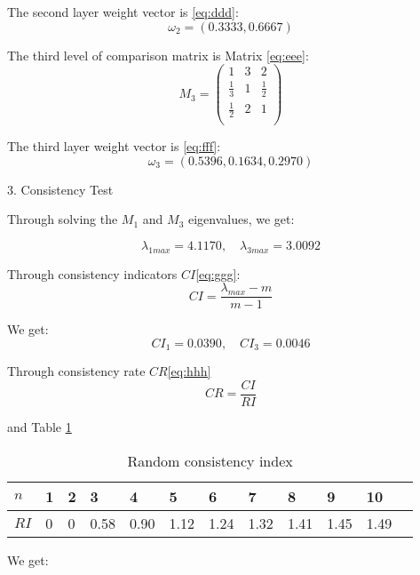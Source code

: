 \documentclass[12pt]{article}  %
\begin{document}
The second layer weight vector is \eqref{eq:ddd}:
\begin{equation}\label{eq:ddd}%
\omega_2=(0.3333,0.6667)
\end{equation}

The third level of comparison matrix is Matrix \eqref{eq:eee}:
\begin{equation}\label{eq:eee}%
M_3=\begin{pmatrix}
1&3&2\\
\frac{1}{3}&1&\frac{1}{2}\\
\frac{1}{2}&2&1\\
\end{pmatrix}
\end{equation}

The third layer weight vector is \eqref{eq:fff}:
\begin{equation}\label{eq:fff}%
\omega_3=(0.5396,0.1634,0.2970)
\end{equation}

3. Consistency Test

Through solving the $M_1$ and $M_3$ eigenvalues, we get:

$$
\lambda_{1max}=4.1170,
\quad\lambda_{3max}=3.0092
$$

Through consistency indicators $CI$\eqref{eq:ggg}:
\begin{equation}\label{eq:ggg}%
CI=\frac{\lambda_{max}-m}{m-1}
\end{equation}

We get:
$$
CI_1=0.0390,\quad CI_3=0.0046
$$

Through consistency rate $CR$\eqref{eq:hhh} 
\begin{equation}\label{eq:hhh}%
CR=\frac{CI}{RI}
\end{equation}

and Table \ref{tb:mmm} 
\begin{table}[htbp]
	\centering
	\caption{Random consistency index}
	\begin{tabular}{l|lllllllllll} %
		\toprule
		$n$\cite{7} &1&2&      3&   4&   5&   6&   7&   8&   9&  10\\
		\midrule
        $RI$&  0&  0&  0.58&  0.90&  1.12&  1.24&  1.32&  1.41&  1.45&  1.49\\
		\bottomrule
	\end{tabular}\label{tb:mmm}
\end{table}
\newpage
We get:
\end{document}

